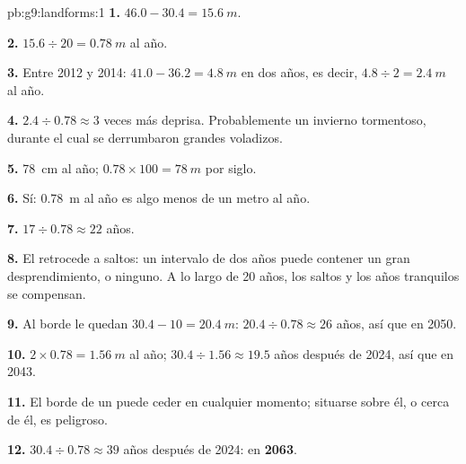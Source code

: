 \begin{solution}{pb:g9:landforms:1}
\textbf{1.} $46.0 - 30.4 = \qty{15.6}{m}$.

\textbf{2.} $15.6 \div 20 = \qty{0.78}{m}$ al año.

\textbf{3.} Entre 2012 y 2014: $41.0 - 36.2 = \qty{4.8}{m}$ en dos
años, es decir, $4.8 \div 2 = \qty{2.4}{m}$ al año.

\textbf{4.} $2.4 \div 0.78 \approx 3$ veces más deprisa. Probablemente un
invierno tormentoso, durante el cual se derrumbaron grandes voladizos.

\textbf{5.} \qty{78}{cm} al año; $0.78 \times 100 = \qty{78}{m}$ por
siglo.

\textbf{6.} Sí: \qty{0.78}{m} al año es algo menos de un metro al año.

\textbf{7.} $17 \div 0.78 \approx 22$ años.

\textbf{8.} El  retrocede a saltos: un intervalo de dos años
puede contener un gran desprendimiento, o ninguno. A lo largo de 20 años,
los saltos y los años tranquilos se compensan.

\textbf{9.} Al borde le quedan $30.4 - 10 = \qty{20.4}{m}$: $20.4 \div 0.78
\approx 26$ años, así que en 2050.

\textbf{10.} $2 \times 0.78 = \qty{1.56}{m}$ al año; $30.4 \div 1.56
\approx 19.5$ años después de 2024, así que en 2043.

\textbf{11.} El borde de un  puede ceder en cualquier momento;
situarse sobre él, o cerca de él, es peligroso.

\textbf{12.} $30.4 \div 0.78 \approx 39$ años después de 2024: en
\textbf{2063}.
\end{solution}
